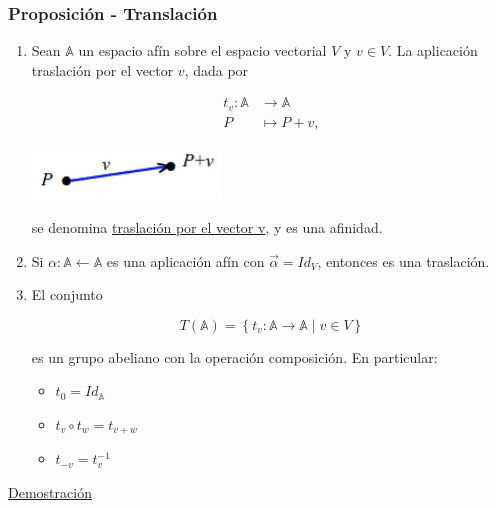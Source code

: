 \documentclass[12pt, a4paper, ones, notitlepage, openany,titlepage]{article}
\newcommand{\demostracion}{\noindent\underline{Demostración}}
\begin{document}
\subsubsection{Proposición - Translación}
\begin{enumerate}
\item Sean $\mathbb{A}$ un espacio afín sobre el espacio vectorial $V$ y $v \in V$. La aplicación traslación por el vector $v$, dada por

$$
\begin{aligned}
t_{v}: \mathbb{A} & \longrightarrow \mathbb{A} \\
P & \longmapsto P+v,
\end{aligned}
$$

\begin{center}
\includegraphics[max width=5cm]{2023_03_01_7659aec5e35f9a9b2d3cg-22}
\end{center}

se denomina \underline{traslación por el vector v}, y es una afinidad.

\item Si $\alpha:\mathbb{A}\longleftarrow\mathbb{A}$ es una aplicación afín con $\vec{\alpha}=Id_{V}$, entonces es una traslación.

\item El conjunto

$$
T(\mathbb{A})=\left\{t_{v}: \mathbb{A} \rightarrow \mathbb{A} \mid v \in V\right\}
$$

es un grupo abeliano con la operación composición. En particular:
\begin{itemize}
\item $t_{0} = Id_{\mathbb{A}}$
\item $t_{v}\circ t_{w} = t_{v+w}$
\item $t_{-v} = t_{v}^{-1}$
\end{itemize}

\end{enumerate}
\demostracion
\end{document}
